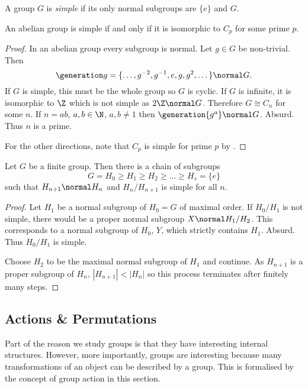 \documentclass[a4paper]{article}
\theoremstyle{definition}
\begin{document}
\begin{definition}
  A group \(G\) is \emph{simple} if its only normal subgroups are \(\{e\}\) and \(G\).
\end{definition}

\begin{lemma}
  An abelian group is simple if and only if it is isomorphic to \(C_p\) for some prime \(p\).
\end{lemma}

\begin{proof}
  In an abelian group every subgroup is normal. Let \(g \in G\) be non-trivial. Then
  \[
    \generation g = \{\dots, g^{-2}, g^{-1}, e, g, g^2, \dots\} \normal G.
  \]
  If \(G\) is simple, this must be the whole group so \(G\) is cyclic. If \(G\) is infinite, it is isomorphic to \(\Z\) which is not simple as \(2\Z \normal G\). Therefore \(G \cong C_n\) for some \(n\). If \(n = ab\), \(a, b \in \N\), \(a, b \neq 1\) then \(\generation{g^a} \normal G\). Absurd. Thus \(n\) is a prime.

  For the other directions, note that \(C_p\) is simple for prime \(p\) by .
\end{proof}

\begin{theorem}
  Let \(G\) be a finite group. Then there is a chain of subgroups
  \[
    G = H_0 \geq H_1 \geq H_2 \geq \dots \geq H_s = \{e\}
  \]
  such that \(H_{n + 1} \normal H_n\) and \(H_n/H_{n + 1}\) is simple for all \(n\).
\end{theorem}

\begin{proof}
  Let \(H_1\) be a normal subgroup of \(H_0 = G\) of maximal order. If \(H_0/H_1\) is not simple, there would be a proper normal subgroup \(X \normal H_1/H_2\). This corresponds to a normal subgroup of \(H_0\), \(Y\), which strictly contains \(H_1\). Absurd. Thus \(H_0/H_1\) is simple.

  Choose \(H_2\) to be the maximal normal subgroup of \(H_1\) and continue. As \(H_{n + 1}\) is a proper subgroup of \(H_n\), \(|H_{n + 1}| < |H_n|\) so this process terminates after finitely many steps.
\end{proof}

\subsection{Actions \& Permutations}

Part of the reason we study groups is that they have interesting internal structures. However, more importantly, groups are interesting because many transformations of an object can be described by a group. This is formalised by the concept of group action in this section.
\end{document}
